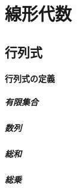 \documentclass{book} %
\begin{document}
	\tableofcontents
	\part{線形代数}
		\chapter{行列式}
			\subsection{行列式の定義}
				\subsubsection{有限集合}
				\subsubsection{数列}
				\subsubsection{総和}
				\subsubsection{総乗}
				
\end{document}
